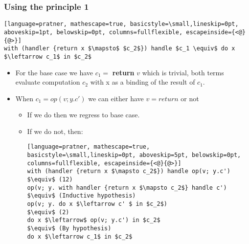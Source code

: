 \documentclass[t]{beamer}
\begin{document}
\begin{frame}[fragile]
	\frametitle{Using the principle 1}
	
	\begin{lstlisting}[language=pratner, mathescape=true, basicstyle=\small,lineskip=0pt, aboveskip=1pt, belowskip=0pt, columns=fullflexible, escapeinside={<@}{@>}]
with (handler {return x $\mapsto$ $c_2$}) handle $c_1 \equiv$ do x $\leftarrow c_1$ in $c_2$ 
	\end{lstlisting}
	
	\begin{itemize}
		\item For the base case we have $c_1 = $ \textbf{return} $v$ which is trivial, both terms evaluate computation $c_2$ with x as a binding of the result of $c_1$.
		\item When $c_1 = op(v; y.c')$ we can either have $v=return$ or not
		\begin{itemize}
		\item If we \alert{do} then we regress to base case.
		\item If we do \alert{not}, then:
		\begin{lstlisting}[language=pratner, mathescape=true, basicstyle=\small,lineskip=0pt, aboveskip=5pt, belowskip=0pt, columns=fullflexible, escapeinside={<@}{@>}]
with (handler {return x $\mapsto c_2$}) handle op(v; y.c')
$\equiv$ (12) 
op(v; y. with handler {return x $\mapsto c_2$} handle c')
$\equiv$ (Inductive hypothesis)
op(v; y. do x $\leftarrow c' $ in $c_2$)
$\equiv$ (2)
do x $\leftarrow$ op(v; y.c') in $c_2$
$\equiv$ (By hypothesis)
do x $\leftarrow c_1$ in $c_2$
		\end{lstlisting}
		
		\end{itemize} 
	\end{itemize}
	
\end{frame}
\end{document}
